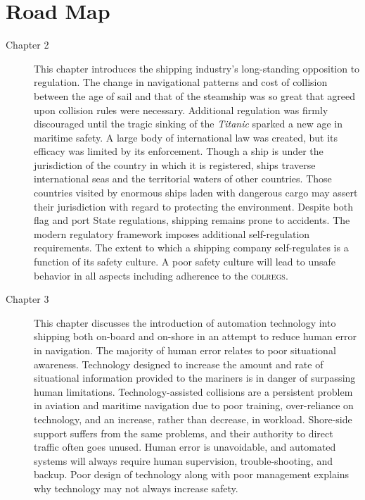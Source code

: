 \documentclass[twoside,symmetric,notoc]{tufte-book}
\begin{document}
\section{Road Map}
\par{%
\begin{description}
\item[Chapter 2] This chapter introduces the shipping industry's long-standing opposition to regulation. The change in navigational patterns and cost of collision between the age of sail and that of the steamship was so great that agreed upon collision rules were necessary. Additional regulation was firmly discouraged until the tragic sinking of the \textit{Titanic} sparked a new age in maritime safety. A large body of international law was created, but its efficacy was limited by its enforcement. Though a ship is under the jurisdiction of the country in which it is registered, ships traverse international seas and the territorial waters of other countries. Those countries visited by enormous ships laden with dangerous cargo may assert their jurisdiction with regard to protecting the environment. Despite both flag and port State regulations, shipping remains prone to accidents. The modern regulatory framework imposes additional self-regulation requirements. The extent to which a shipping company self-regulates is a function of its safety culture. A poor safety culture will lead to unsafe behavior in all aspects including adherence to the \textsc{colregs}.

\item[Chapter 3] This chapter discusses the introduction of automation technology into shipping both on-board and on-shore in an attempt to reduce human error in navigation. The majority of human error relates to poor situational awareness. Technology designed to increase the amount and rate of situational information provided to the mariners is in danger of surpassing human limitations. Technology-assisted collisions are a persistent problem in aviation and maritime navigation due to poor training, over-reliance on technology, and an increase, rather than decrease, in workload. Shore-side support suffers from the same problems, and their authority to direct traffic often goes unused. Human error is unavoidable, and automated systems will always require human supervision, trouble-shooting, and backup. Poor design of technology along with poor management explains why technology may not always increase safety. 


\end{description}}
\end{document}
